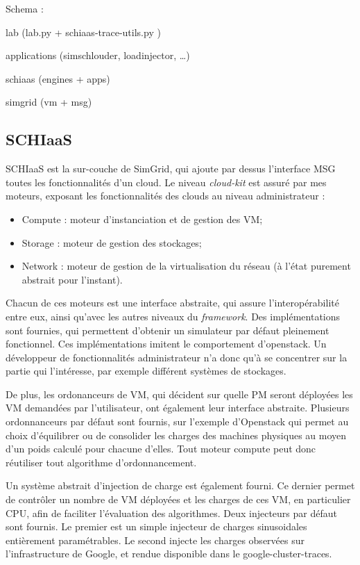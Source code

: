 \documentclass[parallelisme]{compas2017}
\begin{document}
Schema :

lab (lab.py + schiaas-trace-utils.py )

applications (simschlouder, loadinjector, \ldots)

schiaas (engines + apps)

simgrid (vm + msg)


\subsection{SCHIaaS}

SCHIaaS est la sur-couche de SimGrid, qui ajoute par dessus l'interface MSG toutes les 
fonctionnalités d'un cloud. 
Le niveau \textit{cloud-kit} est assuré par mes moteurs, exposant les fonctionnalités 
des clouds au niveau administrateur :
\begin{itemize}
 \item Compute : moteur d'instanciation et de gestion des VM;
 \item Storage : moteur de gestion des stockages;
 \item Network : moteur de gestion de la virtualisation du réseau (à l'état purement abstrait pour l'instant).
\end{itemize}

Chacun de ces moteurs est une interface abstraite, qui assure l'interopérabilité entre eux, 
ainsi qu'avec les autres niveaux du \textit{framework}. Des implémentations sont fournies, qui 
permettent d'obtenir un simulateur par défaut pleinement fonctionnel. Ces implémentations 
imitent le comportement d'openstack. Un développeur de fonctionnalités administrateur n'a donc 
qu'à se concentrer sur la partie qui l'intéresse, par exemple différent systèmes de stockages.

De plus, les ordonanceurs de VM, qui décident sur quelle PM seront déployées les VM demandées
par l'utilisateur, ont également leur interface abstraite. Plusieurs ordonnanceurs par défaut
sont fournis, sur l'exemple d'Openstack qui permet au choix d'équilibrer ou de consolider les 
charges des machines physiques au moyen d'un poids calculé pour chacune d'elles. 
Tout moteur compute peut donc réutiliser tout algorithme d'ordonnancement.

Un système abstrait d'injection de charge est également fourni. Ce dernier permet de contrôler 
un nombre de VM déployées et les charges de ces VM, en particulier CPU, afin de faciliter 
l'évaluation des algorithmes. 
Deux injecteurs par défaut sont fournis. Le premier est un simple injecteur de charges sinusoidales
entièrement paramétrables. Le second injecte les charges observées sur l'infrastructure de Google,
et rendue disponible dans le google-cluster-traces.
\end{document}
